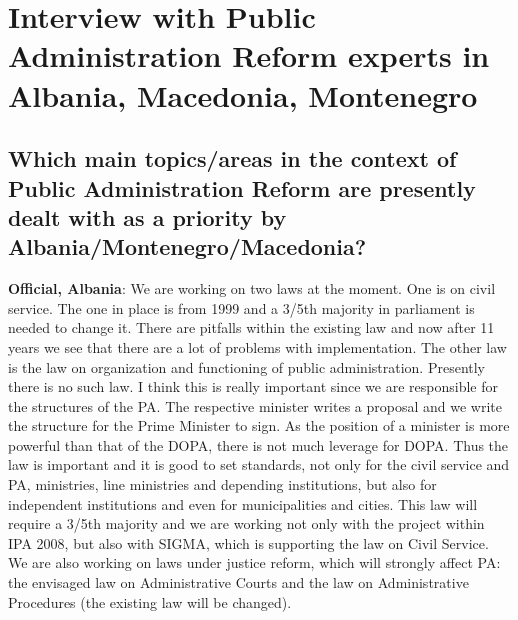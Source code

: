 
\chapter[Interview with Public Administration Reform experts]{Interview with Public Administration Reform experts in Albania, Macedonia, Montenegro}
\label{anhang:InterviewPARExperts}

\section{Which main topics/areas in the context of Public Administration Reform are presently dealt with as a priority by Albania/Montenegro/Macedonia? }
\label{sec:par macedonia}
\textbf{Official, Albania}: We are working on two laws at the moment. One is on civil service. The one in place is from 1999 and a 3/5th majority in parliament is needed to change it. There are pitfalls within the existing law and now after 11 years we see that there are a lot of problems with implementation. The other law is the law on organization and functioning of public administration. Presently there is no such law. I think this is really important since we are responsible for the structures of the PA. The respective minister writes a proposal and we write the structure for the Prime Minister to sign. As the position of a minister is more powerful than that of the DOPA, there is not much leverage for DOPA. Thus the law is important and it is good to set standards, not only for the civil service and PA, ministries, line ministries and depending institutions, but also for independent institutions and even for municipalities and cities. This law will require a 3/5th majority and we are working not only with the project within IPA 2008, but also with SIGMA, which is supporting the law on Civil Service. We are also working on laws under justice reform, which will strongly affect PA: the envisaged law on Administrative Courts and the law on Administrative Procedures (the existing law will be changed).\\

